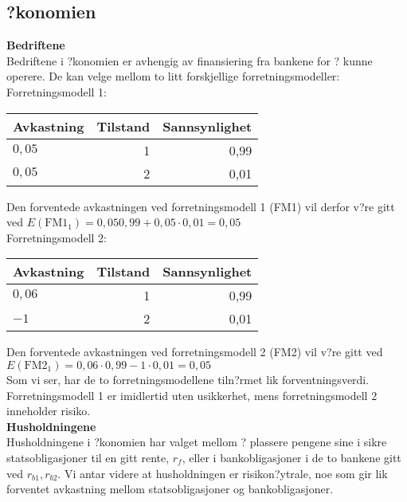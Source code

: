 \documentclass[a4paper,notitlepage]{article}
\begin{document}
\subsection{?konomien}
\textbf{Bedriftene}\\
Bedriftene i ?konomien er avhengig av finansiering fra bankene for ? kunne operere. De kan velge mellom to litt forskjellige forretningsmodeller:
\bigskip\\
\noindent Forretningsmodell 1:\\
\begin{center}
\begin{tabular}{lrr}
\hline
Avkastning     &  Tilstand & Sannsynlighet \\
\hline
$0,05$ &          1 & 0,99 \\
$0,05$ &          2 & 0,01 \\
\end{tabular}
\end{center}
Den forventede avkastningen ved forretningsmodell 1 (FM1) vil derfor v?re gitt ved $E(\text{FM1}_{1})=0,05 0,99+0,05\cdot 0,01=0,05$
\bigskip\\
Forretningsmodell 2:\\
\begin{center}
\begin{tabular}{lrr}
\hline
Avkastning     &  Tilstand & Sannsynlighet \\
\hline
$0,06$ &          1 & 0,99 \\
$-1$ &          2 & 0,01 \\
\end{tabular}
\end{center}
Den forventede avkastningen ved forretningsmodell 2 (FM2) vil v?re gitt ved $E(\text{FM2}_{1})=0,06\cdot 0,99-1\cdot 0,01=0,05$\bigskip\\

Som vi ser, har de to forretningsmodellene tiln?rmet lik forventningsverdi. Forretningsmodell 1 er imidlertid uten usikkerhet, mens forretningsmodell 2 inneholder risiko.\bigskip\\
\textbf{Husholdningene}\\
Husholdningene i ?konomien har valget mellom ? plassere pengene sine i sikre statsobligasjoner til en gitt rente, $r_{f}$, eller i bankobligasjoner i de to bankene gitt ved $r_{b1},r_{b2}$. Vi antar videre at husholdningen er risikon?ytrale, noe som gir lik forventet avkastning mellom statsobligasjoner og bankobligasjoner.\\
\end{document}
